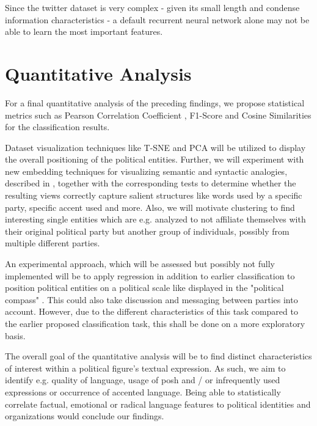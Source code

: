 \documentclass[10pt, oneside]{article}
\begin{document}
\begin{multicols}{2}
Since the twitter dataset is very complex - given its small length and condense information characteristics - a default recurrent neural network alone may not be able to learn the most important features.


\section{Quantitative Analysis}

For a final quantitative analysis of the preceding findings, we propose statistical metrics such as Pearson Correlation Coefficient \cite{Hauke2011}, F1-Score and Cosine Similarities for the classification results.

Dataset visualization techniques like T-SNE \cite{Laurens2008} and PCA \cite{Richardson2009} will be utilized to display the overall positioning of the political entities. Further, we will experiment with new embedding techniques for visualizing semantic and syntactic analogies, described in \cite{8019864}, together with the corresponding tests to determine whether the resulting views correctly capture salient structures like words used by a specific party, specific accent used and more. Also, we will motivate clustering to find interesting single entities which are e.g. analyzed to not affiliate themselves with their original political party but another group of individuals, possibly from multiple different parties.

An experimental approach, which will be assessed but possibly not fully implemented will be to apply regression in addition to earlier classification to position political entities on a political scale like displayed in the "political compass" \cite{PoliticalCompass2017}. This could also take discussion and messaging between parties into account.
However, due to the different characteristics of this task compared to the earlier proposed classification task, this shall be done on a more exploratory basis. 

The overall goal of the quantitative analysis will be to find distinct characteristics of interest within a political figure's textual expression. As such, we aim to identify e.g. quality of language, usage of posh and / or infrequently used expressions or occurrence of accented language.
Being able to statistically correlate factual, emotional or radical language features to political identities and organizations would conclude our findings.


\end{multicols}
\newpage
\end{document}
